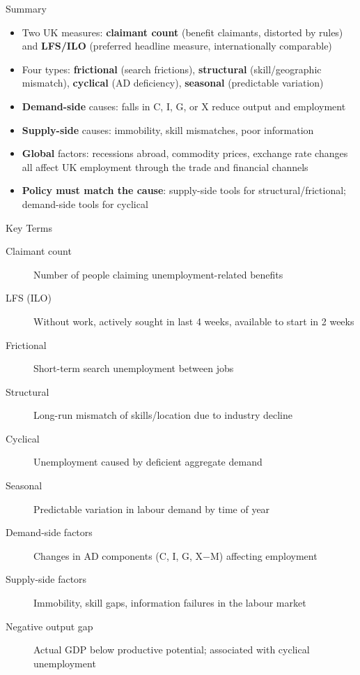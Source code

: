 \documentclass[16pt,aspectratio=169]{beamer}
\begin{document}
\begin{frame}{Summary}
    \begin{itemize}\setlength\itemsep{0.35em}
        \item Two UK measures: \textbf{claimant count} (benefit claimants, distorted by rules) and \textbf{LFS/ILO} (preferred headline measure, internationally comparable)
        \item Four types: \textbf{frictional} (search frictions), \textbf{structural} (skill/geographic mismatch), \textbf{cyclical} (AD deficiency), \textbf{seasonal} (predictable variation)
        \item \textbf{Demand-side} causes: falls in C, I, G, or X reduce output and employment
        \item \textbf{Supply-side} causes: immobility, skill mismatches, poor information
        \item \textbf{Global} factors: recessions abroad, commodity prices, exchange rate changes all affect UK employment through the trade and financial channels
        \item \textbf{Policy must match the cause}: supply-side tools for structural/frictional; demand-side tools for cyclical
    \end{itemize}
\end{frame}

\begin{frame}{Key Terms}
    \begin{description}
        \item[Claimant count] Number of people claiming unemployment-related benefits
        \item[LFS (ILO)] Without work, actively sought in last 4 weeks, available to start in 2 weeks
        \item[Frictional] Short-term search unemployment between jobs
        \item[Structural] Long-run mismatch of skills/location due to industry decline
        \item[Cyclical] Unemployment caused by deficient aggregate demand
        \item[Seasonal] Predictable variation in labour demand by time of year
        \item[Demand-side factors] Changes in AD components (C, I, G, X$-$M) affecting employment
        \item[Supply-side factors] Immobility, skill gaps, information failures in the labour market
        \item[Negative output gap] Actual GDP below productive potential; associated with cyclical unemployment
    \end{description}
\end{frame}
\end{document}
